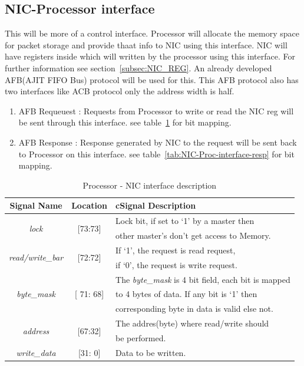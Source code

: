 \documentclass[12pt]{report}
\begin{document}
		\subsection{NIC-Processor interface} \label{AFB}
			This will be more of a control interface. Processor will allocate the memory space for packet storage and provide thaat info to NIC using this interface.
			NIC will have registers inside which will written by the processor using this interface. For further information see section~\ref{subsec:NIC_REG}. An already developed
			AFB(AJIT FIFO Bus) protocol will be used for this. This AFB protocol also has two interfaces like ACB protocol only the address width is half.

			\begin{enumerate}
				\item AFB Requeuest : Requests from Processor to write or read the NIC reg will be sent through this interface. see table~\ref{tab:Proc-NIC-interface-req} for bit mapping.
				\item AFB Response : Response generated by NIC to the request will be sent back to Processor on this interface. see table~\ref{tab:NIC-Proc-interface-resp} for bit mapping.
			\end{enumerate}

				\begin{table}[h]
					\centering
					\begin{tabular}{ccl}
						\hline
						\textbf{Signal Name} 			& \textbf{Location} 		&{c}\textbf{Signal Description}  \\ \hline
						\multirow{2}{*}{\textit{lock}}		& \multirow{2}{*}{[73:73]}	& Lock bit, if set to `1' by a master then\\
											&				& other master's don't get access to Memory.\\ \hline
						\multirow{2}{*}{\textit{read/write\_bar}}& \multirow{2}{*}{[72:72]}	& If `1', the request is read request,\\ 
											& 				& if `0', the request is write request.\\ \hline
						\multirow{3}{*}{\textit{byte\_mask}}	& \multirow{3}{*}{[ 71: 68]}	& The \textit{byte\_mask} is 4 bit field, each bit is mapped\\
											&				& to 4 bytes of data. If any bit is `1' then\\
											& 				& corresponding byte in data is valid else not.\\ \hline 
						\multirow{2}{*}{\textit{address}}   	& \multirow{2}{*}{[67:32]} 	& The addres(byte) where read/write should\\ 
											&				& be performed.\\ \hline
						\textit{write\_data}   			& [31: 0] 			& Data to be written.\\ \hline
					\end{tabular}
					\caption{Processor - NIC interface description}
					\label{tab:Proc-NIC-interface-req}
				\end{table}
\end{document}
